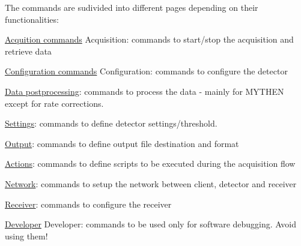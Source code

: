 The commands are sudivided into different pages depending on their functionalities:
\begin{DoxyItemize}
\item \hyperlink{acquisition}{Acquition commands} Acquisition: commands to start/stop the acquisition and retrieve data
\item \hyperlink{config}{Configuration commands} Configuration: commands to configure the detector
\item \hyperlink{data}{Data postprocessing}: commands to process the data -\/ mainly for MYTHEN except for rate corrections.
\item \hyperlink{settings}{Settings}: commands to define detector settings/threshold.
\item \hyperlink{output}{Output}: commands to define output file destination and format
\item \hyperlink{actions}{Actions}: commands to define scripts to be executed during the acquisition flow
\item \hyperlink{network}{Network}: commands to setup the network between client, detector and receiver
\item \hyperlink{receiver}{Receiver}: commands to configure the receiver
\item \hyperlink{test}{Developer} Developer: commands to be used only for software debugging. Avoid using them! 
\end{DoxyItemize}